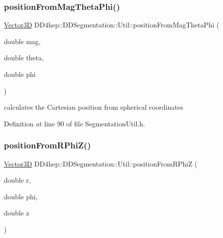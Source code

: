 \hypertarget{namespace_d_d4hep_1_1_d_d_segmentation_1_1_util_a7856bceaaa7bcfa56ad6fe03ef007f8e}{}\label{namespace_d_d4hep_1_1_d_d_segmentation_1_1_util_a7856bceaaa7bcfa56ad6fe03ef007f8e} 
\subsubsection{\texorpdfstring{position\+From\+Mag\+Theta\+Phi()}{positionFromMagThetaPhi()}}
{\footnotesize\ttfamily \hyperlink{struct_d_d4hep_1_1_d_d_segmentation_1_1_vector3_d}{Vector3D} D\+D4hep\+::\+D\+D\+Segmentation\+::\+Util\+::position\+From\+Mag\+Theta\+Phi (\begin{DoxyParamCaption}\item[{double}]{mag,  }\item[{double}]{theta,  }\item[{double}]{phi }\end{DoxyParamCaption})}



calculates the Cartesian position from spherical coordinates 



Definition at line 90 of file Segmentation\+Util.\+h.

\hypertarget{namespace_d_d4hep_1_1_d_d_segmentation_1_1_util_a26afeef0487b44d0d1c634f43e1de11a}{}\label{namespace_d_d4hep_1_1_d_d_segmentation_1_1_util_a26afeef0487b44d0d1c634f43e1de11a} 
\subsubsection{\texorpdfstring{position\+From\+R\+Phi\+Z()}{positionFromRPhiZ()}}
{\footnotesize\ttfamily \hyperlink{struct_d_d4hep_1_1_d_d_segmentation_1_1_vector3_d}{Vector3D} D\+D4hep\+::\+D\+D\+Segmentation\+::\+Util\+::position\+From\+R\+PhiZ (\begin{DoxyParamCaption}\item[{double}]{r,  }\item[{double}]{phi,  }\item[{double}]{z }\end{DoxyParamCaption})}



